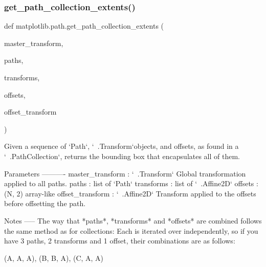 \subsubsection{\texorpdfstring{get\+\_\+path\+\_\+collection\+\_\+extents()}{get\_path\_collection\_extents()}}
{\footnotesize\ttfamily def matplotlib.\+path.\+get\+\_\+path\+\_\+collection\+\_\+extents (\begin{DoxyParamCaption}\item[{}]{master\+\_\+transform,  }\item[{}]{paths,  }\item[{}]{transforms,  }\item[{}]{offsets,  }\item[{}]{offset\+\_\+transform }\end{DoxyParamCaption})}

\begin{DoxyVerb}Given a sequence of `Path`\s, `~.Transform`\s objects, and offsets, as
found in a `~.PathCollection`, returns the bounding box that encapsulates
all of them.

Parameters
----------
master_transform : `~.Transform`
    Global transformation applied to all paths.
paths : list of `Path`
transforms : list of `~.Affine2D`
offsets : (N, 2) array-like
offset_transform : `~.Affine2D`
    Transform applied to the offsets before offsetting the path.

Notes
-----
The way that *paths*, *transforms* and *offsets* are combined
follows the same method as for collections:  Each is iterated over
independently, so if you have 3 paths, 2 transforms and 1 offset,
their combinations are as follows:

    (A, A, A), (B, B, A), (C, A, A)
\end{DoxyVerb}
 